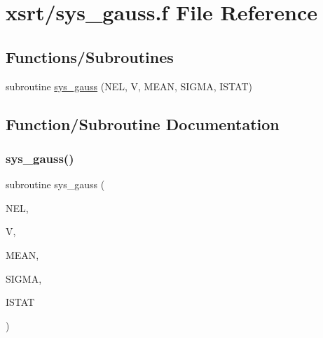 \hypertarget{sys__gauss_8f}{}\section{xsrt/sys\+\_\+gauss.f File Reference}
\label{sys__gauss_8f}
\subsection*{Functions/\+Subroutines}
\begin{DoxyCompactItemize}
\item 
subroutine \hyperlink{sys__gauss_8f_a35c16377ab4fe2812a5a3b37512e11e6}{sys\+\_\+gauss} (N\+EL, V, M\+E\+AN, S\+I\+G\+MA, I\+S\+T\+AT)
\end{DoxyCompactItemize}


\subsection{Function/\+Subroutine Documentation}
\mbox{\label{sys__gauss_8f_a35c16377ab4fe2812a5a3b37512e11e6}} 
\subsubsection{\texorpdfstring{sys\+\_\+gauss()}{sys\_gauss()}}
{\footnotesize\ttfamily subroutine sys\+\_\+gauss (\begin{DoxyParamCaption}\item[{integer}]{N\+EL,  }\item[{double precision, dimension(nel)}]{V,  }\item[{double precision}]{M\+E\+AN,  }\item[{double precision}]{S\+I\+G\+MA,  }\item[{integer}]{I\+S\+T\+AT }\end{DoxyParamCaption})}

